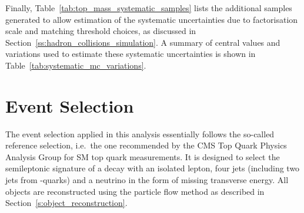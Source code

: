 
Finally, Table~\ref{tab:top_mass_systematic_samples} lists the additional samples generated to allow estimation of the
systematic uncertainties due to factorisation scale and matching threshold choices, as discussed in
Section~\ref{ss:hadron_collisions_simulation}. A summary of central values and variations used to estimate these
systematic uncertainties is shown in Table~\ref{tab:systematic_mc_variations}.








\section{Event Selection}
\label{s_top_mass:event_selection}

The event selection applied in this analysis essentially follows the so-called reference selection, i.e.\ the one
recommended by the CMS Top Quark Physics Analysis Group for SM top quark measurements. It is designed to select the
semileptonic signature of a \ttbar decay with an isolated lepton, four jets (including two jets from \cPqb-quarks) and
a neutrino in the form of missing transverse energy. All objects are reconstructed using the particle flow method as
described in Section~\ref{s:object_reconstruction}.

